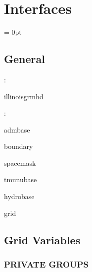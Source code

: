 
\section{Interfaces} 


\parskip = 0pt

\vspace{3mm} \subsection*{General}

: 

illinoisgrmhd
\vspace{2mm}

: 

admbase

boundary

spacemask

tmunubase

hydrobase

grid
\vspace{2mm}
\subsection*{Grid Variables}
\vspace{5mm}\subsubsection{PRIVATE GROUPS}

\vspace{5mm}

